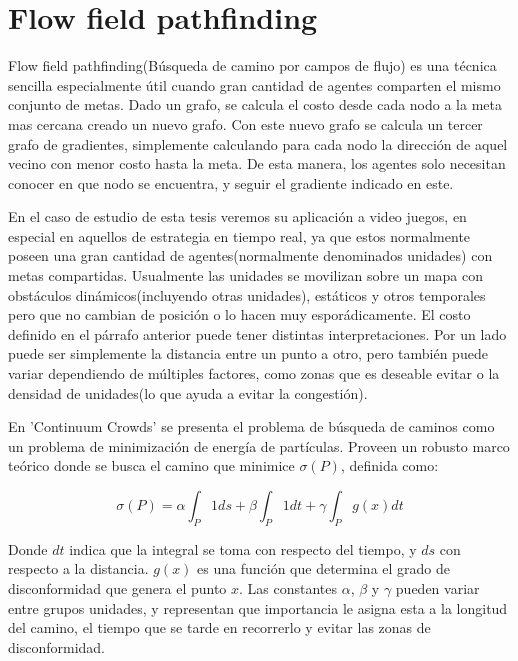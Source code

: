 
\section{Flow field pathfinding}

Flow field pathfinding(Búsqueda de camino por campos de flujo) es una técnica
sencilla especialmente útil cuando gran cantidad de agentes comparten el mismo
conjunto de metas. Dado un grafo, se calcula el costo desde cada nodo a la meta
mas cercana creado un nuevo grafo. Con este nuevo grafo se calcula un tercer
grafo de gradientes, simplemente calculando para cada nodo la dirección de aquel
vecino con menor costo hasta la meta. De esta manera, los agentes solo necesitan
conocer en que nodo se encuentra, y seguir el gradiente indicado en este.

En el caso de estudio de esta tesis veremos su aplicación a video juegos, en
especial en aquellos de estrategia en tiempo real, ya que estos normalmente
poseen una gran cantidad de agentes(normalmente denominados unidades) con metas
compartidas. Usualmente las unidades se movilizan sobre un mapa con obstáculos
dinámicos(incluyendo otras unidades), estáticos y otros temporales pero que no
cambian de posición o lo hacen muy esporádicamente. El costo definido en el
párrafo anterior puede tener distintas interpretaciones. Por un lado puede ser
simplemente la distancia entre un punto a otro, pero también puede variar
dependiendo de múltiples factores, como zonas que es deseable evitar o la
densidad de unidades(lo que ayuda a evitar la congestión).

En 'Continuum Crowds'\cite{CC06} se presenta el problema de búsqueda de caminos
como un problema de minimización de energía de partículas. Proveen un robusto
marco teórico donde se busca el camino que minimice $ \sigma(P) $, definida
como:

\begin{equation} \sigma(P) = \alpha \int_P 1 ds + \beta \int_P 1 dt + \gamma
\int_P g(x) dt \label{eqCost} \end{equation}

Donde $dt$ indica que la integral se toma con respecto del tiempo, y $ds$ con
respecto a la distancia. $ g(x) $ es una función que determina el grado de
disconformidad que genera el punto $ x $. Las constantes $\alpha$, $\beta$ y
$\gamma$ pueden variar entre grupos unidades, y representan que importancia le
asigna esta a la longitud del camino, el tiempo que se tarde en recorrerlo y
evitar las zonas de disconformidad.

